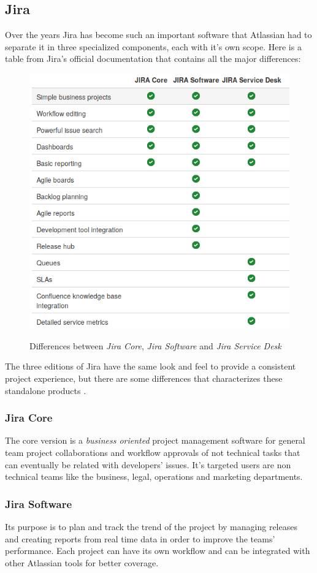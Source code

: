 	\subsection{Jira}
		Over the years Jira has become such an important software that Atlassian had to separate it in three specialized components, each with it's own scope.
		Here is a table from Jira's official documentation \cite{server_jira+jsd_product-changes} that contains all the major differences:
		\begin{figure}[H]
			\centering
			\includegraphics[width=.8\textwidth]{resources/jira_type}\\
			\caption{Differences between \textit{Jira Core}, \textit{Jira Software} and \textit{Jira Service Desk}}
		\end{figure}
		The three editions of Jira have the same look and feel to provide a consistent project experience, but there are some differences that characterizes these standalone products \cite{what-are-the-differences}.
		\subsubsection{Jira Core}
			The core version is a \textit{business oriented} project management software for general team project collaborations and workflow approvals of not technical tasks that can eventually be related with developers' issues.
			It's targeted users are non technical teams like the business, legal, operations and marketing departments.
			
		\subsubsection{Jira Software}
			Its purpose is to plan and track the trend of the project by managing releases and creating reports from real time data in order to improve the teams' performance.
			Each project can have its own workflow and can be integrated with other Atlassian tools for better coverage.
		
